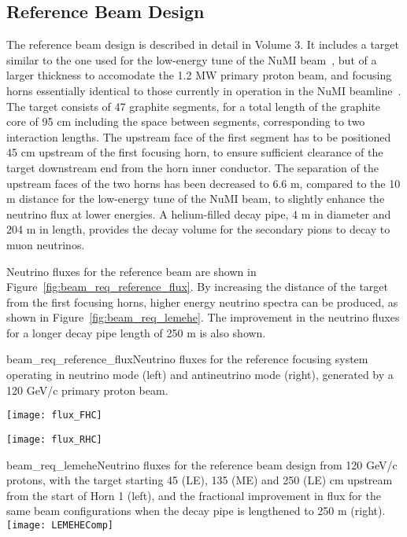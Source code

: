 \subsection{Reference Beam Design}
\label{subsec:reference-design-focusing-system}
The reference beam design is described in detail in Volume 3. It includes a target similar to the one used for the low-energy tune of the NuMI beam~\cite{numitdr}, but of a larger thickness to accomodate the 1.2 MW primary proton beam, and focusing horns essentially identical to those currently in operation in the NuMI beamline~\cite{numitdr}. The target consists of 47 graphite segments, for a total length of the graphite core of 95 cm including the space between segments, corresponding to two interaction lengths. The upstream face of the first segment has to be positioned 45 cm upstream of the first focusing horn, to ensure sufficient clearance of the target downstream end from the horn inner conductor. The separation of the upstream faces of the two horns has been decreased to 6.6 m, compared to the 10 m distance for the low-energy tune of the NuMI beam, to slightly enhance the neutrino flux at lower energies. A helium-filled decay pipe, 4 m in diameter and 204 m in length, provides the decay volume for the secondary pions to decay to muon neutrinos. 

Neutrino fluxes for the reference beam are shown in Figure~\ref{fig:beam_req_reference_flux}.  By increasing the distance of the target from the first focusing horns, higher energy neutrino spectra can be produced, as shown in Figure~\ref{fig:beam_req_lemehe}. The improvement in the neutrino fluxes for a longer decay pipe length of 250 m is also shown.

\begin{cdrfigure}{beam_req_reference_flux}{Neutrino fluxes for the reference 
    focusing system operating in neutrino mode (left) and antineutrino 
    mode (right), generated by a 120 GeV/c primary proton beam.} 
\centering 
\begin{minipage}{0.45\textwidth}
\centering 
\texttt{[image: flux\_FHC]}
\end{minipage}\hfill 
\begin{minipage}{0.45\textwidth}
\centering 
\texttt{[image: flux\_RHC]}
\end{minipage}
\end{cdrfigure}
\begin{cdrfigure} {beam_req_lemehe}{Neutrino fluxes for the 
    reference beam design from 120 GeV/c protons, with the target starting 45 (LE), 135 (ME) 
    and 250 (LE) cm upstream from the start of Horn 1 (left), and the
    fractional improvement in flux for the same beam configurations 
    when the decay pipe is lengthened to 250 m (right).}
    \texttt{[image: LEMEHEComp]}
  \end{cdrfigure}

